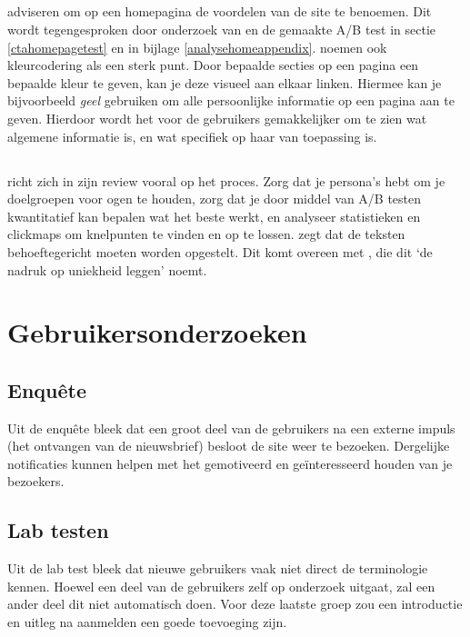\documentclass[a4paper, 10pt, pdftex]{report}
\begin{document}
      \subsection{\cite{Hoekman2008}}
        \citeauthor{Hoekman2008} adviseren om op een homepagina de voordelen van de site te benoemen. Dit wordt tegengesproken door onderzoek van \cite{Beenen2004} en de gemaakte A/B test in sectie \ref{ctahomepagetest} en in bijlage \ref{analysehomeappendix}. \citeauthor{Hoekman2008} noemen ook kleurcodering als een sterk punt. Door bepaalde secties op een pagina een bepaalde kleur te geven, kan je deze visueel aan elkaar linken. Hiermee kan je bijvoorbeeld \emph{geel} gebruiken om alle persoonlijke informatie op een pagina aan te geven. Hierdoor wordt het voor de gebruikers gemakkelijker om te zien wat algemene informatie is, en wat specifiek op haar van toepassing is.

      \subsection{\cite{Timmerman2008}}
        \citeauthor{Timmerman2008} richt zich in zijn review vooral op het proces. Zorg dat je persona's hebt om je doelgroepen voor ogen te houden, zorg dat je door middel van A/B testen kwantitatief kan bepalen wat het beste werkt, en analyseer statistieken en clickmaps om knelpunten te vinden en op te lossen. \citeauthor{Timmerman2008} zegt dat de teksten behoeftegericht moeten worden opgestelt. Dit komt overeen met \cite{Beenen2004}, die dit `de nadruk op uniekheid leggen' noemt.

  \section{Gebruikersonderzoeken}
    \subsection{Enqu\^ete}
      Uit de enqu\^ete bleek dat een groot deel van de gebruikers na een externe impuls (het ontvangen van de nieuwsbrief) besloot de site weer te bezoeken. Dergelijke notificaties kunnen helpen met het gemotiveerd en ge\"interesseerd houden van je bezoekers.

    \subsection{Lab testen}
      Uit de lab test bleek dat nieuwe gebruikers vaak niet direct de terminologie kennen. Hoewel een deel van de gebruikers zelf op onderzoek uitgaat, zal een ander deel dit niet automatisch doen. Voor deze laatste groep zou een introductie en uitleg na aanmelden een goede toevoeging zijn.
\end{document}
